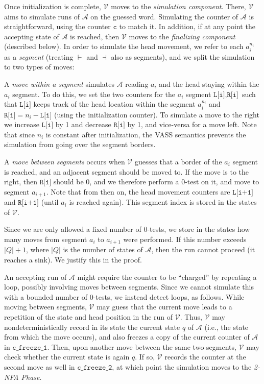 \documentclass[11pt,a4paper]{amsart}
\theoremstyle{definition}
\newcommand{\lmark}{\vdash}
\newcommand{\rmark}{\dashv}
\newcommand{\vf}[1]{\texttt{#1}}
\newcommand{\cA}{\mathcal{A}}
\newcommand{\cV}{\mathcal{V}}
\begin{document}
Once initialization is complete, $\cV$ moves to the \emph{simulation
	component}. There, $\cV$ aims to simulate runs of $\cA$ on the guessed
word. Simulating the counter of $\cA$ is straightforward, using the counter $\vf{c}$ to match it.
In addition, if at any point the accepting state of $\cA$ is reached, then $\cV$ moves to the \emph{finalizing component} (described
below). 
In order to simulate the head movement, we refer to each $a_i^{n_i}$ as
a \emph{segment} (treating $\lmark$ and $\rmark$ also as segments), and we split
the simulation to two types of moves:
\begin{compactitem}
	\item A \emph{move within a segment} simulates $\cA$ reading $a_i$ and the
	head staying within the $a_i$ segment. To do this, we set the two counters for
	the $a_i$ segment $\vf{L[i]},\vf{R[i]}$ such that $\vf{L[i]}$ keeps track of the head
	location within the segment $a_i^{n_i}$ and $\vf{R[i]}=n_i-\vf{L[i]}$ (using the
	initialization counter). To simulate a move to the right we increase $\vf{L[i]}$
	by 1 and decrease $\vf{R[i]}$ by 1, and vice-versa for a move left. Note that
	since $n_i$ is constant after initialization, the VASS semantics prevents
	the simulation from going over the segment borders.
	\item A \emph{move between segments} occurs when $\cV$ guesses that a border
	of the $a_i$ segment is reached, and an adjacent segment should be moved
	to. If the move is to the right, then $\vf{R[i]}$ should be $0$, and we therefore
	perform a $0$-test on it, and move to segment $a_{i+1}$. Note that from then
	on, the head movement counters are $\vf{L[i+1]}$ and $\vf{R[i+1]}$ (until $a_i$ is
	reached again). This segment index is stored in the states of $\cV$.
	
	Since we are only allowed a fixed number of $0$-tests, we store in the
	states how many moves from segment $a_i$ to $a_{i+1}$ were performed. If
	this number exceeds $|Q|+1$, where $|Q|$ is the number of states of $\cA$,
	then the run cannot proceed (it reaches a sink). We justify this in the
	proof.
\end{compactitem}

An accepting run of $\cA$ might require the counter to be ``charged'' by
repeating a loop, possibly involving moves between segments. Since we cannot
simulate this with a bounded number of $0$-tests, we instead detect loops, as
follows.  While moving between segments, $\cV$ may guess that the current move
leads to a repetition of the state and head position in the run of $\cV$. Thus,
$\cV$ may nondeterministically record in its state the current state $q$ of
$\cA$ (i.e., the state from which the move occurs), and also freezes a copy of
the current counter of $\cA$ in $\vf{c\_freeze\_1}$.  Then, upon another move
between the same two segments, $\cV$ may check whether the current state is
again $q$. If so, $\cV$ records the counter at the second move as well in
$\vf{c\_freeze\_2}$, at which point the simulation moves to the \emph{2-NFA
	Phase}.
\end{document}
